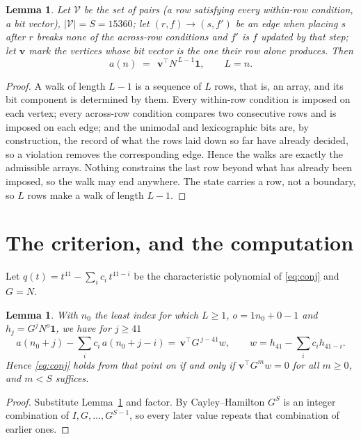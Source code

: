 \documentclass[11pt,a4paper]{article}
\theoremstyle{plain}
\newtheorem{lemma}[theorem]{Lemma}
\theoremstyle{definition}
\begin{document}
\begin{lemma}\label{lem:walk}
Let $\mathcal V$ be the set of pairs (a row satisfying every within-row condition, a
bit vector), $|\mathcal V|=S=15360$; let $(r,f)\to(s,f')$ be an edge when placing $s$ after $r$
breaks none of the across-row conditions and $f'$ is $f$ updated by that step; let
$\mathbf{v}$ mark the vertices whose bit vector is the one their row alone produces.
Then
\[
a(n)\;=\;\,\mathbf{v}^{\!\top}N^{\,L-1}\mathbf{1},\qquad L=n.
\]
\end{lemma}

\begin{proof}
A walk of length $L-1$ is a sequence of $L$ rows, that is, an array, and its bit component
is determined by them. Every within-row condition is imposed on each vertex; every
across-row condition compares two consecutive rows and is imposed on each edge; and the
unimodal and lexicographic bits are, by construction, the record of what the rows laid down
so far have already decided, so a violation removes the corresponding edge. Hence the walks
are exactly the admissible arrays. Nothing constrains the last row beyond what has already
been imposed, so the walk may end anywhere. The state carries a row, not a boundary, so
$L$ rows make a walk of length $L-1$.
\end{proof}

\section{The criterion, and the computation}

Let $q(t)=t^{41}-\sum_i c_i\,t^{41-i}$ be the characteristic polynomial of
\eqref{eq:conj} and $G=N$.

\begin{lemma}\label{lem:crit}
With $n_0$ the least index for which $L\ge1$, $o=1n_0+0-1$ and
$h_j=G^{j}N^{o}\mathbf{1}$, we have for $j\ge41$
\[
a(n_0+j)-\sum_i c_i\,a(n_0+j-i)=\,\mathbf{v}^{\!\top}G^{\,j-41}w,
\qquad w=h_{41}-\sum_i c_ih_{41-i} .
\]
Hence \eqref{eq:conj} holds from that point on if and only if
$\mathbf{v}^{\!\top}G^{m}w=0$ for all $m\ge0$, and $m<S$ suffices.
\end{lemma}

\begin{proof}
Substitute Lemma~\ref{lem:walk} and factor. By Cayley--Hamilton $G^{S}$ is an integer
combination of $I,G,\dots,G^{S-1}$, so every later value repeats that combination of
earlier ones.
\end{proof}
\end{document}
